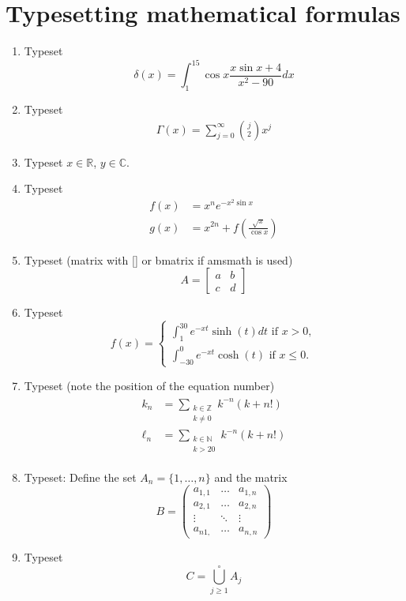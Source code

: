 \documentclass[11pt,reqno]{amsart}
\begin{document}
\section{Typesetting mathematical formulas}

\begin{enumerate}

\item  Typeset
\[
\delta(x) = \int_1^{15} \cos x\frac{ x\sin x + 4}{x^2-90} dx 
\]

\item Typeset
\begin{align}
\Gamma(x) = \sum_{j=0}^\infty \binom{j}{2} x^j
\end{align}

\item Typeset $x\in \mathbb{R}$, $y\in \mathbb{C}$. 

\item Typeset
\begin{align*}
f(x) &= x^n e^{-x^2 \sin x}\\
g(x) &= x^{2n} + f\left( \frac{\sqrt{x} }{\cos x} \right)
\end{align*}

\item Typeset (matrix with [] or bmatrix if amsmath is used)
\[
A = \left[ \begin{matrix} a & b \\ c & d \end{matrix} \right]
\]

\item Typeset
\[
f(x) = \begin{cases}
\displaystyle \int_1^{30} e^{-xt} \sinh(t) dt\text{ if }x>0,\\[1.5ex]
\displaystyle \int_{-30}^0 e^{-xt} \cosh(t) \text{ if }x\le 0.
\end{cases}
\]

\item Typeset (note the position of the equation number)
\begin{align}
\begin{split}
k_n & = \sum_{\substack{k\in\mathbb{Z} \\ k\neq 0}} k^{-n} (k+n!)\\
\ell_n & = \sum_{\substack{ k\in\mathbb{N} \\ k>20}} k^{-n} (k+n!)
\end{split}
\end{align}

\item Typeset: Define the set $A_n = \{ 1, \dots ,n\}$ and the matrix
\[
B = \begin{pmatrix}
 a_{1,1} & \dots & a_{1,n} \\
 a_{2,1} & \dots & a_{2,n} \\
 \vdots & \ddots & \vdots \\
 a_{n1,} & \dots & a_{n,n}
\end{pmatrix}
\]

\item Typeset
\[
 C = \overset{\circ}{\bigcup_{j\ge 1}} A_j
\]

\end{enumerate}
\end{document}
